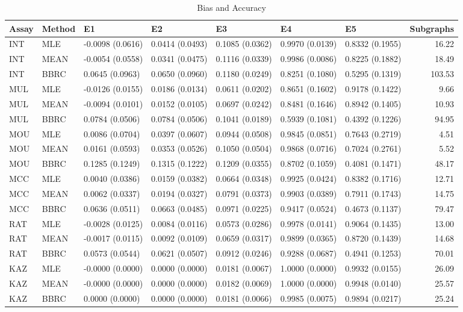 \begin{table}[t]
\begin{center}
  {\small \begin{tabular}{lllllllr}
  \hline
 Assay & Method & E1 & E2 & E3 & E4 & E5 & Subgraphs \\ 
  \hline
  INT & MLE & -0.0098 (0.0616) & 0.0414 (0.0493) & 0.1085 (0.0362) & 0.9970 (0.0139) & 0.8332 (0.1955) & 16.22 \\ 
  INT & MEAN & -0.0054 (0.0558) & 0.0341 (0.0475) & 0.1116 (0.0339) & 0.9986 (0.0086) & 0.8225 (0.1882) & 18.49 \\ 
  INT & BBRC & 0.0645 (0.0963) & 0.0650 (0.0960) & 0.1180 (0.0249) & 0.8251 (0.1080) & 0.5295 (0.1319) & 103.53 \\ 
  MUL & MLE & -0.0126 (0.0155) & 0.0186 (0.0134) & 0.0611 (0.0202) & 0.8651 (0.1602) & 0.9178 (0.1422) & 9.66 \\ 
  MUL & MEAN & -0.0094 (0.0101) & 0.0152 (0.0105) & 0.0697 (0.0242) & 0.8481 (0.1646) & 0.8942 (0.1405) & 10.93 \\ 
  MUL & BBRC & 0.0784 (0.0506) & 0.0784 (0.0506) & 0.1041 (0.0189) & 0.5939 (0.1081) & 0.4392 (0.1226) & 94.95 \\ 
  MOU & MLE & 0.0086 (0.0704) & 0.0397 (0.0607) & 0.0944 (0.0508) & 0.9845 (0.0851) & 0.7643 (0.2719) & 4.51 \\ 
  MOU & MEAN & 0.0161 (0.0593) & 0.0353 (0.0526) & 0.1050 (0.0504) & 0.9868 (0.0716) & 0.7024 (0.2761) & 5.52 \\ 
  MOU & BBRC & 0.1285 (0.1249) & 0.1315 (0.1222) & 0.1209 (0.0355) & 0.8702 (0.1059) & 0.4081 (0.1471) & 48.17 \\ 
  MCC & MLE & 0.0040 (0.0386) & 0.0159 (0.0382) & 0.0664 (0.0348) & 0.9925 (0.0424) & 0.8382 (0.1716) & 12.71 \\ 
  MCC & MEAN & 0.0062 (0.0337) & 0.0194 (0.0327) & 0.0791 (0.0373) & 0.9903 (0.0389) & 0.7911 (0.1743) & 14.75 \\ 
  MCC & BBRC & 0.0636 (0.0511) & 0.0663 (0.0485) & 0.0971 (0.0225) & 0.9417 (0.0524) & 0.4673 (0.1137) & 79.47 \\ 
  RAT & MLE & -0.0028 (0.0125) & 0.0084 (0.0116) & 0.0573 (0.0286) & 0.9978 (0.0141) & 0.9064 (0.1435) & 13.00 \\ 
  RAT & MEAN & -0.0017 (0.0115) & 0.0092 (0.0109) & 0.0659 (0.0317) & 0.9899 (0.0365) & 0.8720 (0.1439) & 14.68 \\ 
  RAT & BBRC & 0.0573 (0.0544) & 0.0621 (0.0507) & 0.0912 (0.0246) & 0.9288 (0.0687) & 0.4941 (0.1253) & 70.01 \\ 
  KAZ & MLE & -0.0000 (0.0000) & 0.0000 (0.0000) & 0.0181 (0.0067) & 1.0000 (0.0000) & 0.9932 (0.0155) & 26.09 \\ 
  KAZ & MEAN & -0.0000 (0.0000) & 0.0000 (0.0000) & 0.0182 (0.0069) & 1.0000 (0.0000) & 0.9948 (0.0140) & 25.57 \\ 
  KAZ & BBRC & 0.0000 (0.0000) & 0.0000 (0.0000) & 0.0181 (0.0066) & 0.9985 (0.0075) & 0.9894 (0.0217) & 25.24 \\ 
   \hline
 \end{tabular} }
\caption{Bias and Accuracy}
\label{t:anal}
\end{center}
\end{table}
